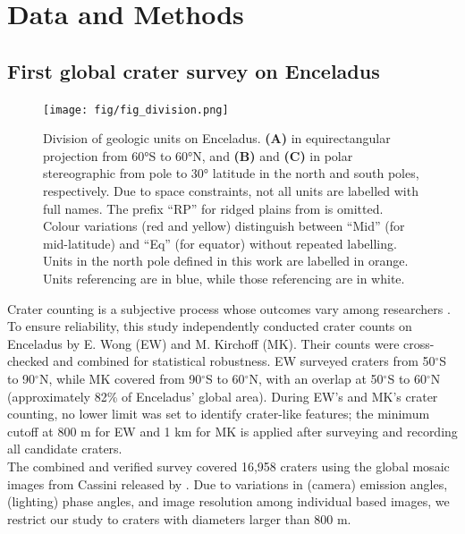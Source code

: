 \documentclass[preprint,12pt,3p,times,authoryear]{elsarticle}
\begin{document}

\section{Data and Methods}
\label{sec:data}

\subsection{First global crater survey on Enceladus}
\label{subsec:crater_count}

\begin{figure}[ht!]
    \centering
    \texttt{[image: fig/fig\_division.png]}
    \caption{Division of geologic units on Enceladus. \textbf{(A)} in equirectangular projection from  60°S to  60°N, and \textbf{(B)} and \textbf{(C)}  in polar stereographic from pole to 30° latitude in the north and south poles, respectively. Due to space constraints, not all units are labelled with full names. The prefix “RP” for ridged plains from \citet{Kirchoff2009} is omitted. Colour variations (red and yellow) distinguish between “Mid” (for mid-latitude) and “Eq” (for equator) without repeated labelling. Units in the north pole defined in this work are labelled in orange. Units referencing \citet{Kirchoff2009} are in blue, while those referencing \citet{CrowWillard2015} are in white. }
    \label{fig:division}
\end{figure}

Crater counting is a subjective process whose outcomes vary among researchers \citep{Robbins2014}. To ensure reliability, this study independently conducted crater counts on Enceladus by E. Wong (EW) and M. Kirchoff (MK). Their counts were cross-checked and combined for statistical robustness. EW surveyed craters from 50$^\circ$S to 90$^\circ$N, while MK covered from 90$^\circ$S to 60$^\circ$N, with an overlap at 50$^\circ$S to 60$^\circ$N (approximately 82\% of Enceladus' global area). During EW’s and MK’s crater counting, no lower limit was set to identify crater-like features; the minimum cutoff at 800 m for EW and 1 km for MK is applied after surveying and recording all candidate craters.\\

The combined and verified survey covered 16,958 craters using the global mosaic images from Cassini released by \citet{Bland2018}. Due to variations in (camera) emission angles, (lighting) phase angles, and image resolution among individual based images, we restrict our study to craters with diameters larger than 800 m. \\
\end{document}
